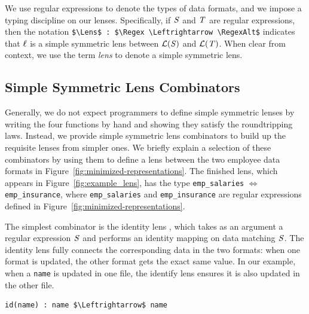 \documentclass[acmsmall,screen,anonymous]{acmart}
\begin{document}

We use regular expressions to denote the types of data formats, and we
impose a typing discipline on our lenses.  Specifically, if 
$\mathit{S}$ and $\mathit{T}$ are regular expressions, then the notation
\lstinline{$\Lens$ : $\Regex \Leftrightarrow \RegexAlt$} indicates that $\mathit{\ell}$
is a simple symmetric lens between $\mathcal{L}(\mathit{S})$ and
$\mathcal{L}(\mathit{T})$. 
When clear from context, we use the term \textit{lens} to denote a
simple symmetric lens.


\subsection{Simple Symmetric Lens Combinators} 
Generally, we do not expect programmers to define simple symmetric lenses by
writing the four functions by hand and showing they satisfy the
roundtripping laws.  Instead, we provide simple symmetric lens
combinators to build up the requisite lenses from simpler ones.
We briefly explain a selection of these combinators by using them to
define a lens between 
the two employee data formats in Figure~\ref{fig:minimized-representations}. 
The finished lens, which appears in Figure~\ref{fig:example_lens}, has
the type 
\lstinline{emp_salaries} $\Leftrightarrow$ \lstinline{emp_insurance}, where
\lstinline{emp_salaries} and \lstinline{emp_insurance} are regular
expressions defined in Figure~\ref{fig:minimized-representations}. 


The simplest combinator is the identity lens \IdentityLens, which takes as an
argument a regular expression $\mathit{S}$ and performs an identity mapping on data
matching $\mathit{S}$. The identity lens fully connects the
corresponding data in the two formats: when one format is
updated, the other format gets the exact same value. In our example,
when a \lstinline{name} is updated in one file, the identify lens ensures it is
also updated in the other file. 

%
\begin{lstlisting}
id(name) : name $\Leftrightarrow$ name
\end{lstlisting}
%
\end{document}
